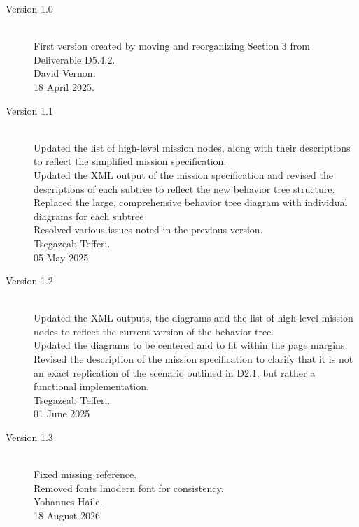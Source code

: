 \documentclass{CSSRforAfrica}
\begin{document}
\begin{description}

\item [Version 1.0]~\\
First version created by moving and reorganizing Section 3 from Deliverable D5.4.2. \\
David Vernon.\\
18 April 2025.   \\               

\item [Version 1.1]~\\
Updated the list of high-level mission nodes, along with their descriptions to reflect the simplified mission specification.\\
Updated the XML output of the mission specification and revised the descriptions of each subtree to reflect the new behavior tree structure.\\
Replaced the large, comprehensive behavior tree diagram with individual diagrams for each subtree\\
Resolved various issues noted in the previous version.\\
Tsegazeab Tefferi.\\
05 May 2025

\item [Version 1.2]~\\
Updated the XML outputs, the diagrams and the list of high-level mission nodes to reflect the current version of the behavior tree.\\
Updated the diagrams to be centered and to fit within the page margins.\\
Revised the description of the mission specification to clarify that it is not an exact replication of the scenario outlined in D2.1, but rather a functional implementation.\\
Tsegazeab Tefferi.\\
01 June 2025

\item [Version 1.3]~\\
Fixed missing reference.\\
Removed fonts lmodern font for consistency.\\
Yohannes Haile.\\
18 August 2026


\end{description}
\end{document}
